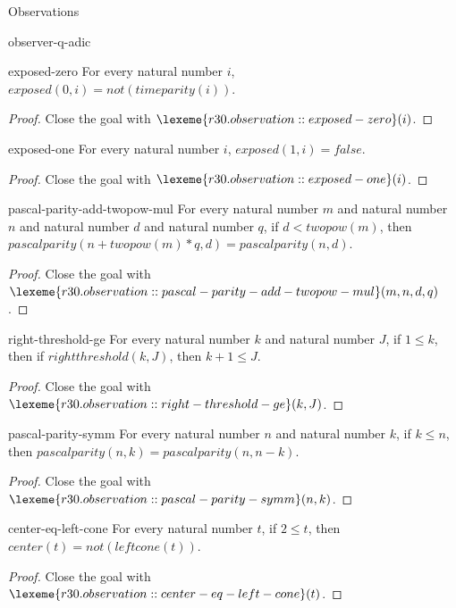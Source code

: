 \begin{lexlean}{Observations}
\begin{section}{observer-q-adic}
\begin{theorem}{exposed-zero}
For every natural number \(i\), \(exposed(0, i) = not(timeparity(i))\).
\begin{proof}
Close the goal with \(\lexeme{r30.observation::exposed-zero}(i)\).
\end{proof}
\end{theorem}

\begin{theorem}{exposed-one}
For every natural number \(i\), \(exposed(1, i) = false\).
\begin{proof}
Close the goal with \(\lexeme{r30.observation::exposed-one}(i)\).
\end{proof}
\end{theorem}

\begin{theorem}{pascal-parity-add-twopow-mul}
For every natural number \(m\) and natural number \(n\) and natural number \(d\) and natural number \(q\), if \(d < twopow(m)\), then \(pascalparity(n + twopow(m) * q, d) = pascalparity(n, d)\).
\begin{proof}
Close the goal with \(\lexeme{r30.observation::pascal-parity-add-twopow-mul}(m, n, d, q)\).
\end{proof}
\end{theorem}

\begin{theorem}{right-threshold-ge}
For every natural number \(k\) and natural number \(J\), if \(1 ≤ k\), then if \(rightthreshold(k, J)\), then \(k + 1 ≤ J\).
\begin{proof}
Close the goal with \(\lexeme{r30.observation::right-threshold-ge}(k, J)\).
\end{proof}
\end{theorem}

\begin{theorem}{pascal-parity-symm}
For every natural number \(n\) and natural number \(k\), if \(k ≤ n\), then \(pascalparity(n, k) = pascalparity(n, n - k)\).
\begin{proof}
Close the goal with \(\lexeme{r30.observation::pascal-parity-symm}(n, k)\).
\end{proof}
\end{theorem}

\begin{theorem}{center-eq-left-cone}
For every natural number \(t\), if \(2 ≤ t\), then \(center(t) = not(leftcone(t))\).
\begin{proof}
Close the goal with \(\lexeme{r30.observation::center-eq-left-cone}(t)\).
\end{proof}
\end{theorem}


\end{section}
\end{lexlean}
